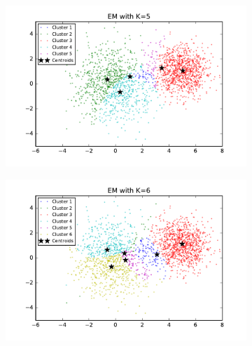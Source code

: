 \begin{description}
\begin{description}
\begin{figure}[!h]
\begin{subfigure}[b]{0.475\textwidth}
        \end{subfigure}
        \begin{subfigure}[b]{0.475\textwidth}  
            \centering 
            \includegraphics[width=\textwidth]{./figures/clustering_EM_5.pdf}
        \end{subfigure}
        \hfill
        \begin{subfigure}[b]{0.475\textwidth}   
            \centering 
            \includegraphics[width=\textwidth]{./figures/clustering_EM_6.pdf}
        \end{subfigure}
        \begin{subfigure}[b]{0.475\textwidth}   
            \centering 

\end{subfigure}
\end{figure}
\end{description}
\end{description}
